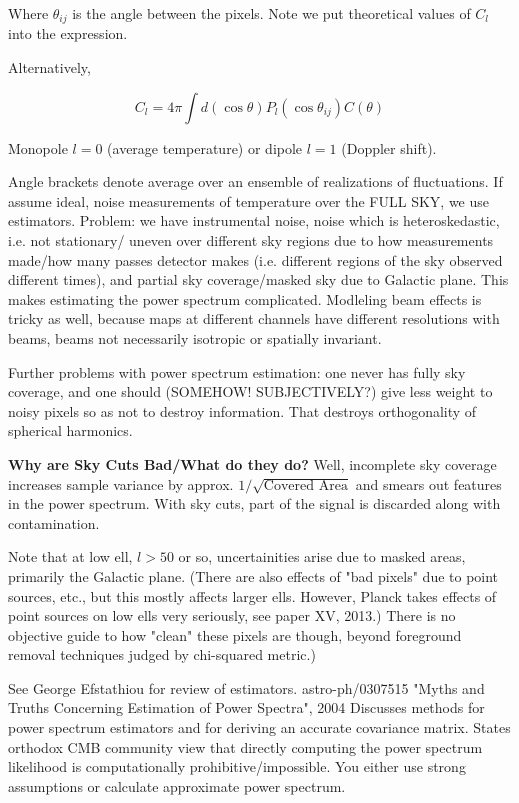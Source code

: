 \documentclass[a4paper, 11pt]{article}
\begin{document}
Where $\theta_{ij}$ is the angle between the pixels. Note we put theoretical values of $C_l$ into the expression.

Alternatively, 

$$
C_l=4\pi\int d(\cos\theta)P_l(\cos\theta_{ij})C(\theta)
$$

Monopole $l=0$ (average temperature) or dipole $l=1$ (Doppler shift). 



Angle brackets denote average over an ensemble of realizations of fluctuations. If assume ideal, noise measurements of temperature over the FULL SKY, we use estimators. Problem: we have instrumental noise, noise which is heteroskedastic, i.e. not stationary/ uneven over different sky regions due to how measurements made/how many passes detector makes (i.e. different regions of the sky observed different times), and partial sky coverage/masked sky due to Galactic plane. This makes estimating the power spectrum complicated. Modleling beam effects is tricky as well, because maps at different channels have different resolutions with beams, beams not necessarily isotropic or spatially invariant. 

Further problems with power spectrum estimation: one never has fully sky coverage, and one should (SOMEHOW! SUBJECTIVELY?) give less weight to noisy pixels so as not to destroy information. That destroys orthogonality of spherical harmonics. 

\textbf{Why are Sky Cuts Bad/What do they do?}
Well, incomplete sky coverage increases sample variance by approx. $1/\sqrt{\text{Covered \ Area}}$ and smears out features in the power spectrum. 
With sky cuts, part of the signal is discarded along with contamination.

Note that at low ell, $l>50$ or so, uncertainities arise due to masked areas, primarily the Galactic plane. (There are also effects of "bad pixels" due to point sources, etc., but this mostly affects larger ells. However, Planck takes effects of point sources on low ells very seriously, see paper XV, 2013.)  There is no objective guide to how "clean" these pixels are though, beyond foreground removal techniques judged by chi-squared metric.)

See George Efstathiou for review of estimators. astro-ph/0307515
"Myths and Truths Concerning Estimation of Power Spectra", 2004
Discusses methods for power spectrum estimators and for deriving an accurate covariance matrix. States orthodox CMB community view that directly computing the power spectrum likelihood is computationally prohibitive/impossible. You either use strong assumptions or calculate approximate power spectrum. 
\end{document}
